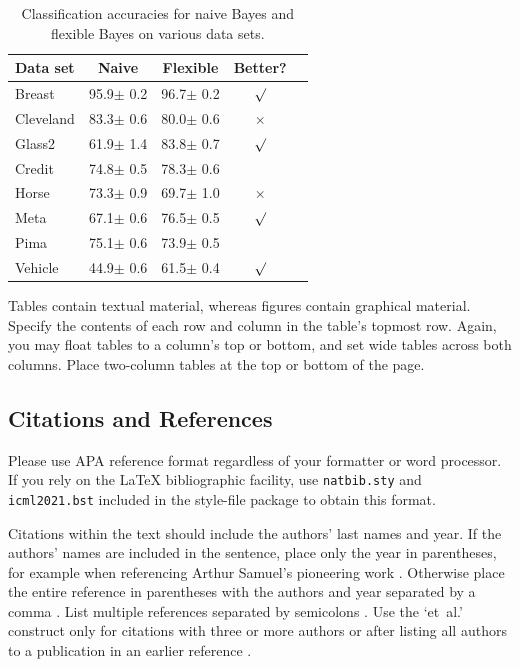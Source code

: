 \begin{table}[t]
\caption{Classification accuracies for naive Bayes and flexible
Bayes on various data sets.}
\label{sample-table}
\vskip 0.15in
\begin{center}
\begin{small}
\begin{sc}
\begin{tabular}{lcccr}
\toprule
Data set & Naive & Flexible & Better? \\
\midrule
Breast    & 95.9$\pm$ 0.2& 96.7$\pm$ 0.2& $\surd$ \\
Cleveland & 83.3$\pm$ 0.6& 80.0$\pm$ 0.6& $\times$\\
Glass2    & 61.9$\pm$ 1.4& 83.8$\pm$ 0.7& $\surd$ \\
Credit    & 74.8$\pm$ 0.5& 78.3$\pm$ 0.6&         \\
Horse     & 73.3$\pm$ 0.9& 69.7$\pm$ 1.0& $\times$\\
Meta      & 67.1$\pm$ 0.6& 76.5$\pm$ 0.5& $\surd$ \\
Pima      & 75.1$\pm$ 0.6& 73.9$\pm$ 0.5&         \\
Vehicle   & 44.9$\pm$ 0.6& 61.5$\pm$ 0.4& $\surd$ \\
\bottomrule
\end{tabular}
\end{sc}
\end{small}
\end{center}
\vskip -0.1in
\end{table}

Tables contain textual material, whereas figures contain graphical material.
Specify the contents of each row and column in the table's topmost
row. Again, you may float tables to a column's top or bottom, and set
wide tables across both columns. Place two-column tables at the
top or bottom of the page.

\subsection{Citations and References}

Please use APA reference format regardless of your formatter
or word processor. If you rely on the \LaTeX\/ bibliographic
facility, use \texttt{natbib.sty} and \texttt{icml2021.bst}
included in the style-file package to obtain this format.

Citations within the text should include the authors' last names and
year. If the authors' names are included in the sentence, place only
the year in parentheses, for example when referencing Arthur Samuel's
pioneering work . Otherwise place the entire
reference in parentheses with the authors and year separated by a
comma \cite{Samuel59}. List multiple references separated by
semicolons \cite{kearns89,Samuel59,mitchell80}. Use the `et~al.'
construct only for citations with three or more authors or after
listing all authors to a publication in an earlier reference \cite{MachineLearningI}.

